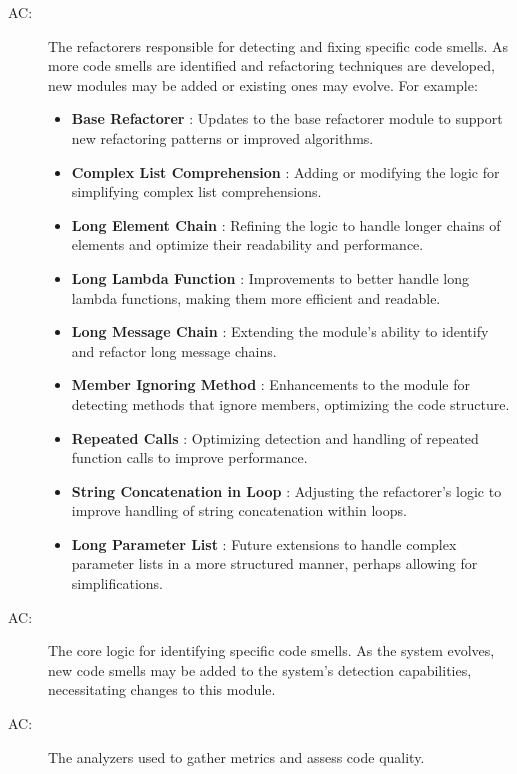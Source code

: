 \documentclass[12pt, titlepage]{article}
\newcounter{acnum}
\newcommand{\actheacnum}{AC\theacnum}
\begin{document}
\begin{description}
  \item[ \actheacnum \label{acRefactorers}:] The refactorers responsible
    for detecting and fixing specific code smells. As more code smells are identified
    and refactoring techniques are developed, new modules may be added or existing
    ones may evolve. For example:
    \begin{itemize}
      \item \textbf{Base Refactorer} \label{acBaseRefactorer}: Updates to the base refactorer module to
      support new refactoring patterns or improved algorithms.
      \item \textbf{Complex List Comprehension} \label{acComplexListComprehension}: Adding or modifying
      the logic for simplifying complex list comprehensions.
      \item \textbf{Long Element Chain} \label{acLongElementChain}: Refining the logic to handle longer
      chains of elements and optimize their readability and performance.
      \item \textbf{Long Lambda Function} \label{acLongLambdaFunction}: Improvements to better handle
      long lambda functions, making them more efficient and readable.
      \item \textbf{Long Message Chain} \label{acLongMessageChain}: Extending the module's ability
      to identify and refactor long message chains.
      \item \textbf{Member Ignoring Method} \label{acMemberIgnoringMethod}: Enhancements to the
      module for detecting methods that ignore members, optimizing the code structure.
      \item \textbf{Repeated Calls} \label{acRepeatedCalls}: Optimizing detection and handling
      of repeated function calls to improve performance.
      \item \textbf{String Concatenation in Loop} \label{acStringConcatenationInLoop}: Adjusting
      the refactorer's logic to improve handling of string concatenation within loops.
      \item \textbf{Long Parameter List} \label{acLongParameterList}: Future extensions to handle
      complex parameter lists in a more structured manner, perhaps allowing for simplifications.
    \end{itemize}
    
  \item[ \actheacnum \label{acSmell}:] The core logic
    for identifying specific code smells. As the system evolves, new code smells may be added to the system’s detection capabilities, necessitating changes to this module.
  
  \item[ \actheacnum \label{acAnalyzer}:] The analyzers used to
    gather metrics and assess code quality.
  
\end{description}  
\end{document}
